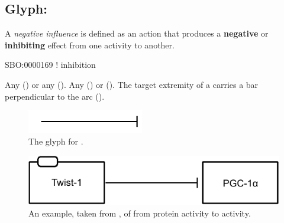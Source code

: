 \subsection{Glyph: }
\label{sec:af:negative_infl}

A \emph{negative influence} is defined as an action that produces a \textbf{negative} or \textbf{inhibiting} effect from one activity to another.

\begin{glyphDescription}

\glyphSboTerm SBO:0000169 ! inhibition

 \glyphOrigin Any  () or any  ().
 \glyphTarget Any  () or  ().
 \glyphEndPoint The target extremity of a  carries a bar perpendicular to the arc ().

\end{glyphDescription}

\begin{figure}[H]
  \centering
  \includegraphics[width = 2in]{images/build/negativeInfluence.pdf}
  \caption{The \AF glyph for .}
  \label{fig:af:negativeInfl}
\end{figure}

\begin{figure}[H]
  \centering
  \includegraphics[scale=1]{src/images/build/negative_influence_example.pdf}
  \caption{An example, taken from , of  from  protein activity to  activity.}
  \label{fig:af:ex-NI}
\end{figure} 